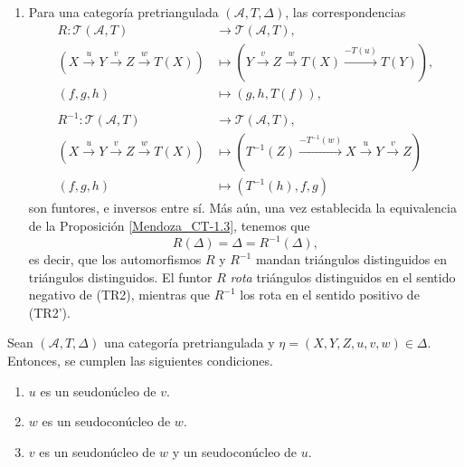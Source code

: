 \documentclass[tesis]{subfiles}
\begin{document}
\begin{Obs}
\begin{enumerate}[label=(\arabic*)]
    \item Para una categoría pretriangulada $(\mathscr{A},T,\Delta)$, las correspondencias
        \begin{align*}
            R:\mathscr{T}(\mathscr{A},T) &\to \mathscr{T}(\mathscr{A},T), \\
            (X\xrightarrow[]{u}Y\xrightarrow[]{v}Z\xrightarrow[]{w}T(X)) &\mapsto (Y\xrightarrow[]{v}Z\xrightarrow[]{w}T(X)\xrightarrow[]{-T(u)}T(Y)), \\
            (f,g,h) &\mapsto (g,h,T(f)), \\ \\
            R^{-1}:\mathscr{T}(\mathscr{A},T) &\to \mathscr{T}(\mathscr{A},T), \\
            (X\xrightarrow[]{u}Y\xrightarrow[]{v}Z\xrightarrow[]{w}T(X)) &\mapsto (T^{-1}(Z)\xrightarrow[]{-T^{-1}(w)}X\xrightarrow[]{u}Y\xrightarrow[]{v}Z) \\
            (f,g,h) &\mapsto (T^{-1}(h),f,g)
        \end{align*}
        son funtores, e inversos entre sí. Más aún, una vez establecida la equivalencia de la Proposición \ref{Mendoza_CT-1.3}, tenemos que
        \[
            R(\Delta) = \Delta = R^{-1}(\Delta),
        \] 
        es decir, que los automorfismos $R$ y $R^{-1}$ mandan triángulos distinguidos en triángulos distinguidos. El funtor $R$ \emph{rota} triángulos distinguidos en el sentido negativo de (TR2), mientras que $R^{-1}$ los rota en el sentido positivo de (TR2').
    \end{enumerate}
\end{Obs}

\begin{Prop}\label{Mendoza_CT-Ejer.2}
    Sean $(\mathscr{A},T,\Delta)$ una categoría pretriangulada y $\eta=(X,Y,Z,u,v,w)\in\Delta$. Entonces, se cumplen las siguientes condiciones.
    \begin{enumerate}[label=(\alph*)]
    
        \item $u$ es un seudonúcleo de $v$.

        \item $w$ es un seudoconúcleo de $w$.

        \item $v$ es un seudonúcleo de $w$ y un seudoconúcleo de $u$.
    \end{enumerate}
\end{Prop}
\end{document}
